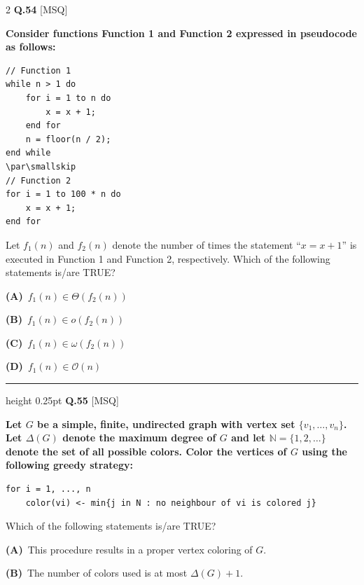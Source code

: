 \documentclass[a4paper,10pt,twoside]{article}
\begin{document}
\begin{multicols}{2}
\noindent\textbf{Q.54} \hfill {\footnotesize\textsf{[MSQ]}}
\par\vspace{2pt}
{\bfseries Consider functions Function 1 and Function 2 expressed in pseudocode as follows:
\begin{lstlisting}
// Function 1
while n > 1 do
    for i = 1 to n do
        x = x + 1;
    end for
    n = floor(n / 2);
end while
\par\smallskip
// Function 2
for i = 1 to 100 * n do
    x = x + 1;
end for
\end{lstlisting}
Let $f_1(n)$ and $f_2(n)$ denote the number of times the statement ``$x = x + 1$'' is executed in Function 1 and Function 2, respectively.
Which of the following statements is/are TRUE? \par}
\par\vspace{2pt}\noindent
\textbf{(A)}~$f_1(n) \in \Theta(f_2(n))$\par\vspace{2pt}\noindent
\textbf{(B)}~$f_1(n) \in o(f_2(n))$\par\vspace{2pt}\noindent
\textbf{(C)}~$f_1(n) \in \omega(f_2(n))$\par\vspace{2pt}\noindent
\textbf{(D)}~$f_1(n) \in \mathcal{O}(n)$
\par\vspace{6pt}\hrule height 0.25pt\vspace{6pt}
\noindent\textbf{Q.55} \hfill {\footnotesize\textsf{[MSQ]}}
\par\vspace{2pt}
{\bfseries Let $G$ be a simple, finite, undirected graph with vertex set $\{v_1, \dots, v_n\}$. Let $\Delta(G)$ denote the maximum degree of $G$ and let $\mathbb{N} = \{1, 2, \dots\}$ denote the set of all possible colors. Color the vertices of $G$ using the following greedy strategy:
\begin{lstlisting}
for i = 1, ..., n
    color(vi) <- min{j in N : no neighbour of vi is colored j}
\end{lstlisting}
Which of the following statements is/are TRUE? \par}
\par\vspace{2pt}\noindent
\textbf{(A)}~This procedure results in a proper vertex coloring of $G$.\par\vspace{2pt}\noindent
\textbf{(B)}~The number of colors used is at most $\Delta(G) + 1$.\par\vspace{2pt}\noindent

\end{multicols}
\end{document}

